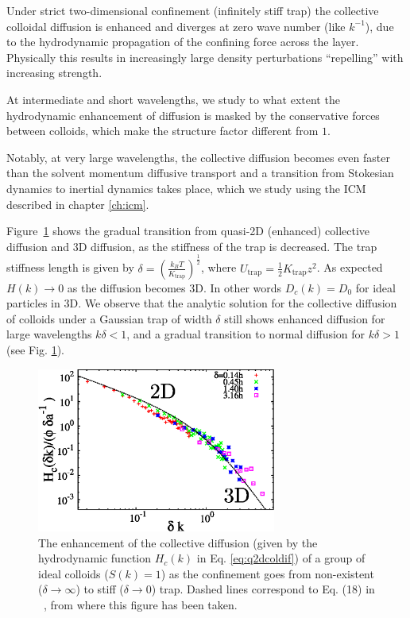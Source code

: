 \documentclass[ twoside,openright,titlepage,numbers=noenddot,%
headinclude,footinclude,cleardoublepage=empty,abstract=on,
BCOR=5mm,paper=b5,fontsize=11pt, dvipsnames
]{scrreprt}
\newcommand{\kT}{k_B T}
\newcommand{\half}{\frac{1}{2}}
\begin{document}
Under strict two-dimensional confinement (infinitely stiff trap) the collective colloidal diffusion is enhanced and diverges at zero wave number (like $k^{-1}$), due to the hydrodynamic propagation of the confining force across the layer. Physically this results in increasingly large density perturbations ``repelling'' with increasing strength.


At intermediate and short wavelengths, we study to what extent the hydrodynamic enhancement of diffusion is masked by the conservative forces between colloids, which make the structure factor different from $1$. 

Notably, at very large wavelengths, the collective diffusion becomes even faster than the solvent momentum diffusive transport and a transition from Stokesian dynamics to inertial dynamics takes place, which we study using the \gls{ICM} described in chapter \ref{ch:icm}.

Figure~\ref{fig:q2Dfrom3dto2d} shows the gradual transition from quasi-2D (enhanced) collective diffusion and 3D diffusion, as the stiffness of the trap is decreased. The trap stiffness length is given by $\delta = \left(\frac{\kT}{K_{\text{trap}}}\right)^{\half}$, where $U_{\text{trap}} = \half K_{\text{trap}} z^2$. As expected $H(k)\rightarrow0$ as the diffusion becomes 3D. In other words $D_c(k) = D_0$ for ideal particles in 3D. We observe that the analytic solution for the collective diffusion of colloids under a Gaussian trap of width $\delta$ still shows enhanced diffusion for large wavelengths $k\delta < 1$, and a gradual transition to normal diffusion for $k\delta > 1$ (see Fig. \ref{fig:q2Dfrom3dto2d}).

\begin{figure}[H]
  \centering
  \includegraphics[width=0.7\textwidth]{gfx/q2Dfrom3dto2d}
  \caption{The enhancement of the collective diffusion (given by the hydrodynamic function $H_c(k)$ in Eq. \ref{eq:q2dcoldif}) of a group of ideal colloids ($S(k)=1$) as the confinement goes from non-existent ($\delta\rightarrow \infty$) to stiff ($\delta\rightarrow 0$) trap. Dashed lines correspond to Eq. (18) in ~\cite{Pelaez2017}, from where this figure has been taken.}
  \label{fig:q2Dfrom3dto2d}
\end{figure}
\end{document}
